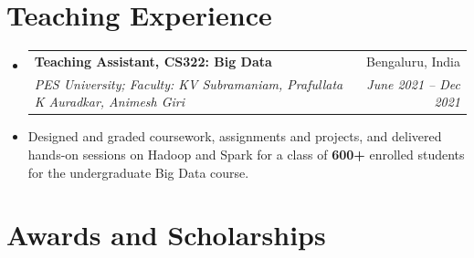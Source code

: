 \documentclass[letterpaper, 11pt]{article}
\makeatletter
\newcommand{\resumeItem}[1]{ \item\small{ {#1 \vspace{-2pt}} } }
\newcommand{\resumeSubheading}[4]{
\vspace{-2pt}
\item
\begin{tabular*}{0.97\textwidth}[t]{l@{\extracolsep{\fill}}r}
	\textbf{#1}       & #2                 \\
	\textit{\small#3} & \textit{\small #4} \\
\end{tabular*}
\vspace{-7pt}
}
\newcommand{\resumeSubHeadingListStart}{\begin{itemize}[leftmargin=0.15in, label={}]}
\newcommand{\resumeSubHeadingListEnd}{\end{itemize}}
\makeatother
\begin{document}
	\section{Teaching Experience}
	\resumeSubHeadingListStart
	\resumeSubheading {Teaching Assistant, CS322: Big Data}{Bengaluru, India}
	{PES University; Faculty: KV Subramaniam, Prafullata K Auradkar, Animesh Giri}{June 2021 -- Dec 2021}

	\resumeItem{Designed and graded coursework, assignments and projects, and delivered hands-on sessions on Hadoop and Spark for a class of \textbf{600+} enrolled students for the undergraduate Big Data course.}

	\resumeSubHeadingListEnd


	\section{Awards and Scholarships}
\end{document}
